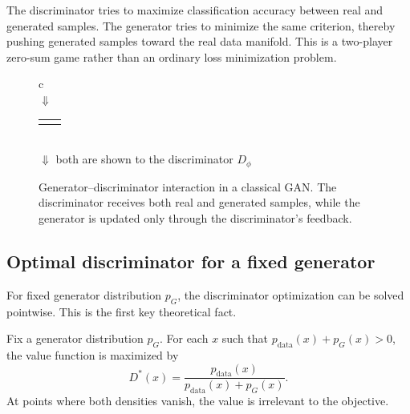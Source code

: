 The discriminator tries to maximize classification accuracy between real and generated samples.
The generator tries to minimize the same criterion, thereby pushing generated samples toward the real data manifold.
This is a two-player zero-sum game rather than an ordinary loss minimization problem.

\begin{figure}[ht]
\centering
\setlength{\fboxsep}{7pt}
\renewcommand{\arraystretch}{1.2}
\begin{tabular}{c}
\\[0.5em]
$\Downarrow$\\[0.5em]
\begin{tabular}{cc}
\fbox{\parbox{0.37\textwidth}{\centering
Generator branch\\[0.3em]
$z\mapsto G_\theta(z)$ produces fake sample $\tilde x$
}}
&
\fbox{\parbox{0.37\textwidth}{\centering
Data branch\\[0.3em]
real sample $x\sim p_{\mathrm{data}}$
}}
\end{tabular}\\[0.8em]
$\Downarrow$ both are shown to the discriminator $D_\phi$\\[0.5em]
\end{tabular}
\caption{Generator--discriminator interaction in a classical GAN. The discriminator receives both real and generated samples, while the generator is updated only through the discriminator's feedback.}
\label{fig:gan-interaction}
\end{figure}

\subsection*{Optimal discriminator for a fixed generator}

For fixed generator distribution $p_G$, the discriminator optimization can be solved pointwise.
This is the first key theoretical fact.

\begin{proposition}
Fix a generator distribution $p_G$.
For each $x$ such that $p_{\mathrm{data}}(x)+p_G(x)>0$, the value function is maximized by
\[
D^*(x)=\frac{p_{\mathrm{data}}(x)}{p_{\mathrm{data}}(x)+p_G(x)}.
\]
At points where both densities vanish, the value is irrelevant to the objective.
\end{proposition}

